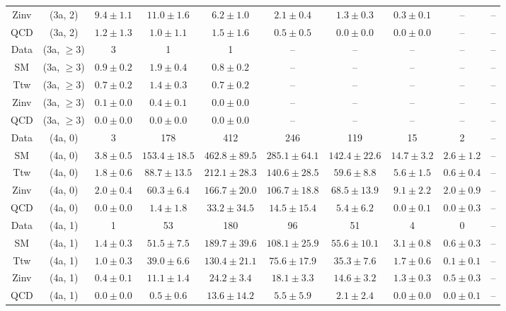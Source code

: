 \begin{table}[h!]
{\begin{tabular}{cccccccccc}
	Zinv & (3a, 2) & $9.4\pm 1.1$ & $11.0\pm 1.6$ & $6.2\pm 1.0$ & $2.1\pm 0.4$ & $1.3\pm 0.3$ & $0.3\pm 0.1$ & -- & -- \\[0.5ex] 
	QCD & (3a, 2) & $1.2\pm 1.3$ & $1.0\pm 1.1$ & $1.5\pm 1.6$ & $0.5\pm 0.5$ & $0.0\pm 0.0$ & $0.0\pm 0.0$ & -- & -- \\[0.5ex] 
	Data & (3a, $\ge3$) & 3 & 1 & 1 & -- & -- & -- & -- & -- \\[0.5ex] 
	SM & (3a, $\ge3$) & $0.9\pm 0.2$ & $1.9\pm 0.4$ & $0.8\pm 0.2$ & -- & -- & -- & -- & -- \\[0.5ex] 
	Ttw & (3a, $\ge3$) & $0.7\pm 0.2$ & $1.4\pm 0.3$ & $0.7\pm 0.2$ & -- & -- & -- & -- & -- \\[0.5ex] 
	Zinv & (3a, $\ge3$) & $0.1\pm 0.0$ & $0.4\pm 0.1$ & $0.0\pm 0.0$ & -- & -- & -- & -- & -- \\[0.5ex] 
	QCD & (3a, $\ge3$) & $0.0\pm 0.0$ & $0.0\pm 0.0$ & $0.0\pm 0.0$ & -- & -- & -- & -- & -- \\[0.5ex] 
	Data & (4a, 0) & 3 & 178 & 412 & 246 & 119 & 15 & 2 & -- \\[0.5ex] 
	SM & (4a, 0) & $3.8\pm 0.5$ & $153.4\pm 18.5$ & $462.8\pm 89.5$ & $285.1\pm 64.1$ & $142.4\pm 22.6$ & $14.7\pm 3.2$ & $2.6\pm 1.2$ & -- \\[0.5ex] 
	Ttw & (4a, 0) & $1.8\pm 0.6$ & $88.7\pm 13.5$ & $212.1\pm 28.3$ & $140.6\pm 28.5$ & $59.6\pm 8.8$ & $5.6\pm 1.5$ & $0.6\pm 0.4$ & -- \\[0.5ex] 
	Zinv & (4a, 0) & $2.0\pm 0.4$ & $60.3\pm 6.4$ & $166.7\pm 20.0$ & $106.7\pm 18.8$ & $68.5\pm 13.9$ & $9.1\pm 2.2$ & $2.0\pm 0.9$ & -- \\[0.5ex] 
	QCD & (4a, 0) & $0.0\pm 0.0$ & $1.4\pm 1.8$ & $33.2\pm 34.5$ & $14.5\pm 15.4$ & $5.4\pm 6.2$ & $0.0\pm 0.1$ & $0.0\pm 0.3$ & -- \\[0.5ex] 
	Data & (4a, 1) & 1 & 53 & 180 & 96 & 51 & 4 & 0 & -- \\[0.5ex] 
	SM & (4a, 1) & $1.4\pm 0.3$ & $51.5\pm 7.5$ & $189.7\pm 39.6$ & $108.1\pm 25.9$ & $55.6\pm 10.1$ & $3.1\pm 0.8$ & $0.6\pm 0.3$ & -- \\[0.5ex] 
	Ttw & (4a, 1) & $1.0\pm 0.3$ & $39.0\pm 6.6$ & $130.4\pm 21.1$ & $75.6\pm 17.9$ & $35.3\pm 7.6$ & $1.7\pm 0.6$ & $0.1\pm 0.1$ & -- \\[0.5ex] 
	Zinv & (4a, 1) & $0.4\pm 0.1$ & $11.1\pm 1.4$ & $24.2\pm 3.4$ & $18.1\pm 3.3$ & $14.6\pm 3.2$ & $1.3\pm 0.3$ & $0.5\pm 0.3$ & -- \\[0.5ex] 
	QCD & (4a, 1) & $0.0\pm 0.0$ & $0.5\pm 0.6$ & $13.6\pm 14.2$ & $5.5\pm 5.9$ & $2.1\pm 2.4$ & $0.0\pm 0.0$ & $0.0\pm 0.1$ & -- \\[0.5ex] 

\end{tabular}}
\end{table}
